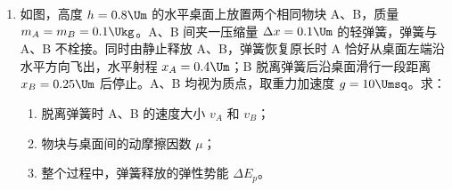\documentclass[\gkver]{gaokaozhenti}
\begin{document}
\begin{enumerate}
{联立整理得 $\frac{U_{m}^{2}}{50R}t = CT_{0}$

解得 $t = \frac{50CT_{0}R}{U_{m}^{2}}$
}

\item
如图，高度 $h = 0.8 \Um$ 的水平桌面上放置两个相同物块 A、B，质量 $m_{A} = m_{B} = 0.1 \Ukg$。A、B 间夹一压缩量 $\Delta x = 0.1 \Um$ 的轻弹簧，弹簧与 A、B 不栓接。同时由静止释放 A、B，弹簧恢复原长时 A 恰好从桌面左端沿水平方向飞出，水平射程 $x_{A} = 0.4 \Um$；B 脱离弹簧后沿桌面滑行一段距离 $x_{B} = 0.25 \Um$ 后停止。A、B 均视为质点，取重力加速度 $g = 10 \Umsq$。求：
\begin{enumerate}
	\item
	脱离弹簧时 A、B 的速度大小 $v_{A}$ 和 $v_{B}$；
	\item
	物块与桌面间的动摩擦因数 $\mu$；
	\item
	整个过程中，弹簧释放的弹性势能 $\Delta E_{p}$。
\end{enumerate}
\end{enumerate}
\end{document}
